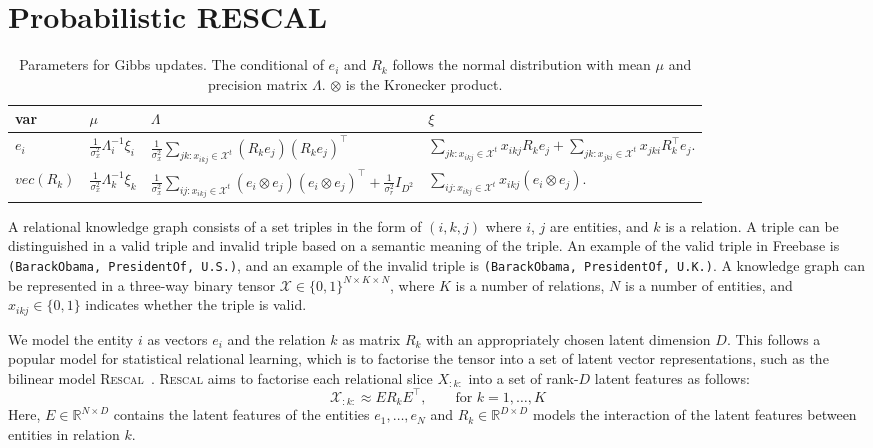 \section{Probabilistic RESCAL}
\label{sec:brescal}

\begin{table*}[bt]
\caption{Parameters for Gibbs updates. The conditional of $e_i$ and $R_k$ follows the normal distribution with mean $\mu$ and precision matrix $\Lambda$. $\otimes$ is the Kronecker product.}
\label{tab:brescalposterior}
\vskip 0.05in
\begin{tabu}{l|l|l|l}
var&$\mu$&$\Lambda$&$\xi$\\
\hline
$e_i$&
$\frac{1}{\sigma_x^2}\Lambda_i^{-1}\xi_i$&
$\frac{1}{\sigma_x^2} \sum_{jk : x_{ikj} \in \mathcal{X}^{t}} (R_k e_j)(R_k e_j)^\top$&
$\sum_{jk : x_{ikj} \in \mathcal{X}^{t}}  x_{ikj} R_{k} e_{j} +
\sum_{jk : x_{jki} \in \mathcal{X}^{t}} x_{jki} R_{k}^\top e_{j}.$
\\
$vec(R_k)$&
$\frac{1}{\sigma_x^2}\Lambda_k^{-1}\xi_k$&
$\frac{1}{\sigma_x^2} \sum_{ij:x_{ikj} \in \mathcal{X}^{t}} (e_i
\otimes e_j)(e_i \otimes e_j)^\top + \frac{1}{\sigma_r^2} {I}_{D^2}$&
$\sum_{ij:x_{ikj} \in \mathcal{X}^{t}} x_{ikj} (e_{i} \otimes e_{j}).$
\end{tabu}
\end{table*}


A relational knowledge graph consists of a set triples in the form of $(i, k, j)$
where $i$, $j$ are entities, and $k$ is a relation. A triple can be distinguished
in a valid triple and invalid triple based on a semantic meaning of the triple. An
example of the valid triple in Freebase is \texttt{(BarackObama, PresidentOf, U.S.)}, and an
example of the invalid triple is \texttt{(BarackObama, PresidentOf, U.K.)}.
A knowledge graph can be represented in a three-way binary tensor
$\mathcal{X} \in \{0, 1\}^{N \times K \times N}$, where $K$ is a number of
relations, $N$ is a number of entities, and $x_{ikj}\in \{0, 1\}$ indicates whether
the triple is valid.

We model the entity $i$ as vectors $e_i$ and the relation $k$ as matrix $R_k$ with an
appropriately chosen latent dimension $D$. This follows a popular model
for statistical relational learning, which is to factorise the tensor into a
set of latent vector representations, such as the bilinear model \textsc{Rescal}~\cite{nickel2011three}.
\textsc{Rescal} aims to factorise each relational slice $X_{:k:}$ into a set of rank-$D$ latent
features as follows:
\[
  \mathcal{X}_{:k:} \approx E R_k E^\top, \qquad \text{for } k = 1, \dots, K
\]
Here, $E\in {\mathbb R}^{N \times D}$ contains the latent features of the
entities $e_1, \ldots, e_N$ and $R_k\in {\mathbb R}^{D \times D}$ models the interaction of the
latent features between entities in relation $k$.

